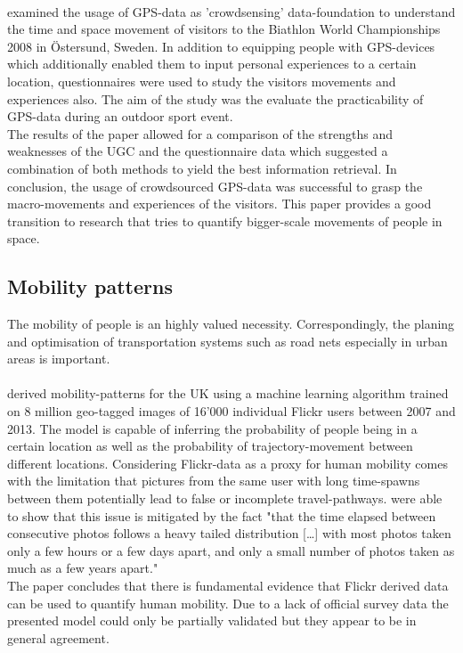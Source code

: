 \paragraph*{\textcite{Pettersson2011}} examined the usage of GPS-data as 'crowdsensing' data-foundation to understand the time and space movement of visitors to the Biathlon World Championships 2008 in \"Ostersund, Sweden. In addition to equipping people with GPS-devices which additionally enabled them to input personal experiences to a certain location, questionnaires were used to study the visitors movements and experiences also. The aim of the study was the evaluate the practicability of GPS-data during an outdoor sport event. \\
The results of the paper allowed for a comparison of the strengths and weaknesses of the UGC and the questionnaire data which suggested a combination of both methods to yield the best information retrieval. In conclusion, the usage of crowdsourced GPS-data was successful to grasp the macro-movements and experiences of the visitors. This paper provides a good transition to research that tries to quantify bigger-scale movements of people in space.

\subsection{Mobility patterns}
The mobility of people is an highly valued necessity. Correspondingly, the planing and optimisation of transportation systems such as road nets especially in urban areas is important. 


\paragraph*{\textcite{Barchiesi2015}} derived mobility-patterns for the UK using a machine learning algorithm trained on 8 million geo-tagged images of 16'000 individual Flickr users between 2007 and 2013. The model is capable of inferring the probability of people being in a certain location as well as the probability of trajectory-movement between different locations. Considering Flickr-data as a proxy for human mobility comes with the limitation that pictures from the same user with long time-spawns between them potentially lead to false or incomplete travel-pathways. \textcite{Barchiesi2015} were able to show that this issue is mitigated by the fact "that the time elapsed between consecutive photos follows a heavy tailed distribution [\dots] with most photos taken only a few hours or a few days apart, and only a small number of photos taken as much as a few years apart." \\
The paper concludes that there is fundamental evidence that Flickr derived data can be used to quantify human mobility. Due to a lack of official survey data the presented model could only be partially validated but they appear to be in general agreement.

